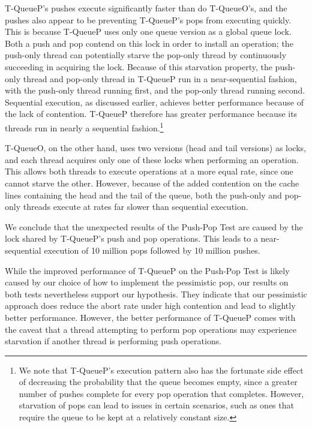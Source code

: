 T-QueueP's pushes execute significantly faster than do T-QueueO's, and the pushes also appear to be preventing T-QueueP's pops from executing quickly. This is because T-QueueP uses only one queue version as a global queue lock. Both a push and pop contend on this lock in order to install an operation; the push-only thread can potentially starve the pop-only thread by continuously succeeding in acquiring the lock.
Because of this starvation property, the push-only thread and pop-only thread in T-QueueP run in a near-sequential fashion, with the push-only thread running first, and the pop-only thread running second.
Sequential execution, as discussed earlier, achieves better performance because of the lack of contention.
T-QueueP therefore has greater performance because its threads run in nearly a sequential fashion.\footnote{We note that T-QueueP's execution pattern also has the fortunate side effect of decreasing the probability that the queue becomes empty, since a greater number of pushes complete for every pop operation that completes. However, starvation of pops can lead to issues in certain scenarios, such as ones that require the queue to be kept at a relatively constant size.}

T-QueueO, on the other hand, uses two versions (head and tail versions) as locks, and each thread acquires only one of these locks when performing an operation. This allows both threads to execute operations at a more equal rate, since one cannot starve the other. However, because of the added contention on the cache lines containing the head and the tail of the queue, both the push-only and pop-only threads execute at rates far slower than sequential execution.

We conclude that the unexpected results of the Push-Pop Test are caused by the lock shared by T-QueueP's push and pop operations. This leads to a near-sequential execution of 10 million pops followed by 10 million pushes. 

While the improved performance of T-QueueP on the Push-Pop Test is likely caused by our choice of how to implement the pessimistic pop, our results on both tests nevertheless support our hypothesis. They indicate that our pessimistic approach does reduce the abort rate under high contention and lead to slightly better performance. However, the better performance of T-QueueP comes with the caveat that a thread attempting to perform pop operations may experience starvation if another thread is performing push operations.

\vspace{12pt}
\noindent{}



